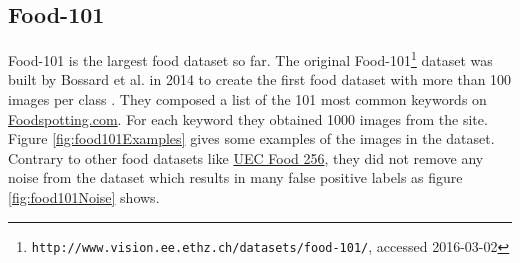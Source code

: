 \subsection{Food-101}
\label{subsec:relWork_Datasets_food101}
Food-101 is the largest food dataset so far. The original Food-101\footnote{\texttt{http://www.vision.ee.ethz.ch/datasets/food-101/}, accessed 2016-03-02} dataset was built by Bossard et al. in 2014 to create the first food dataset with more than 100 images per class \cite{Bossard2014}. They composed a list of the 101 most common keywords on \href{http://Foodspotting.com}{Foodspotting.com}. For each keyword they obtained 1000 images from the site. Figure \ref{fig:food101Examples} gives some examples of the images in the dataset. Contrary to other food datasets like \hyperref[subsec:relWork_Datasets_food100256]{UEC Food 256}, they did not remove any noise from the dataset which results in many false positive labels as figure \ref{fig:food101Noise} shows.

